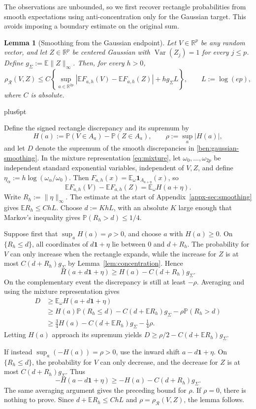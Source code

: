 \documentclass[11pt,letterpaper,twoside,leqno]{article}
\makeatletter
\theoremstyle{bookplain}
\newtheorem{lemma}{Lemma}
\theoremstyle{bookremark}
\renewenvironment{proof}[1][\proofname]{\par
  \pushQED{\qed}\normalfont\topsep6pt plus6pt\relax
  \trivlist\item[\hskip\labelsep\bfseries #1\@addpunct{.}]\ignorespaces
}{\popQED\endtrivlist\@endpefalse}
\newcommand{\E}{\mathbb E}
\newcommand{\Pp}{\mathbb P}
\newcommand{\R}{\mathbb R}
\newcommand{\Var}{\operatorname{Var}}
\newcommand{\rh}{\rho_{\mathcal R}}
\newcommand{\ind}{\mathbf 1}
\makeatother
\begin{document}
The observations are unbounded, so we first recover rectangle
probabilities from smooth expectations using anti-concentration
only for the Gaussian target. This avoids imposing a boundary
estimate on the original sum.

\begin{lemma}[Smoothing from the Gaussian endpoint]\label{ben:smoothing}
Let $V\in\R^p$ be any random vector, and let $Z\in\R^p$
be centered Gaussian with $\Var(Z_j)=1$ for every $j\le p$.
Define $g_\Sigma:=\E\|Z\|_\infty$. Then, for every $h>0$,
\begin{equation}\label{ben:gaussian-smoothing}
 \rh(V,Z)\le C\left\{
 \sup_{a\in\R^{2p}}|\E F_{a,h}(V)-\E F_{a,h}(Z)|
       +hg_\Sigma L\right\},\qquad L:=\log(ep),
\end{equation}
where $C$ is absolute.
\end{lemma}
\begin{proof}
Define the signed rectangle discrepancy and its supremum by
\[
 H(a):=\Pp(V\in A_a)-\Pp(Z\in A_a),\qquad
 \rho:=\sup_a|H(a)|,
\]
and let $D$ denote the supremum of the smooth discrepancies in
\eqref{ben:gaussian-smoothing}. In the mixture representation
\eqref{eq:mixture}, let $\omega_0,\ldots,\omega_{2p}$ be
independent standard exponential variables, independent of $V,Z$,
and define $\eta_\alpha:=h\log(\omega_\alpha/\omega_0)$.
Then $F_{a,h}(x)=\E_\omega\ind_{A_{a+\eta}}(x)$, so
\[
 \E F_{a,h}(V)-\E F_{a,h}(Z)=\E_\omega H(a+\eta).
\]
Write $R_h:=\|\eta\|_\infty$. The estimate at the start of
Appendix~\ref{appx-sec:smoothing} gives $\E R_h\le ChL$.
Choose $d:=KhL$, with an absolute $K$ large enough that Markov's
inequality gives $\Pp(R_h>d)\le1/4$.

Suppose first that $\sup_aH(a)=\rho>0$, and choose $a$ with
$H(a)\ge0$. On $\{R_h\le d\}$, all coordinates of
$d\mathbf1+\eta$ lie between $0$ and $d+R_h$. The probability
for $V$ can only increase when the rectangle expands, while the
increase for $Z$ is at most $C(d+R_h)g_\Sigma$ by
Lemma~\ref{lem:concentration}. Hence
\[
 H(a+d\mathbf1+\eta)\ge H(a)-C(d+R_h)g_\Sigma.
\]
On the complementary event the discrepancy is still at least
$-\rho$. Averaging and using the mixture representation gives
\begin{align*}
 D&\ge\E_\omega H(a+d\mathbf1+\eta)\\
  &\ge H(a)\Pp(R_h\le d)
      -C(d+\E R_h)g_\Sigma-\rho\Pp(R_h>d)\\
  &\ge\tfrac34H(a)-C(d+\E R_h)g_\Sigma-\tfrac14\rho.
\end{align*}
Letting $H(a)$ approach its supremum yields
$D\ge\rho/2-C(d+\E R_h)g_\Sigma$.

If instead $\sup_a(-H(a))=\rho>0$, use the inward shift
$a-d\mathbf1+\eta$. On $\{R_h\le d\}$, the probability for
$V$ can only decrease, and the decrease for $Z$ is at most
$C(d+R_h)g_\Sigma$. Thus
\[
 -H(a-d\mathbf1+\eta)\ge-H(a)-C(d+R_h)g_\Sigma.
\]
The same averaging argument gives the preceding bound for $\rho$.
If $\rho=0$, there is nothing to prove. Since
$d+\E R_h\le ChL$ and $\rho=\rh(V,Z)$, the lemma follows.
\end{proof}
\end{document}
